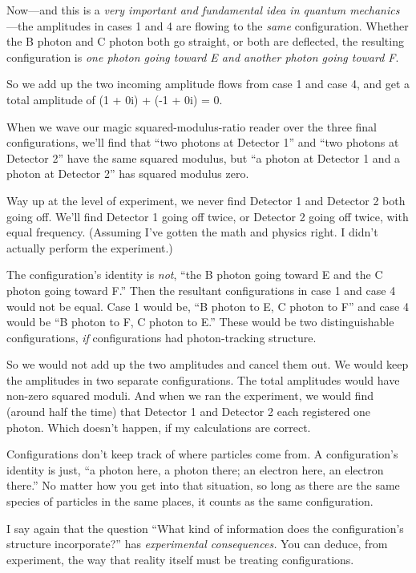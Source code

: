 {
 Now---and this is a \textit{very important and fundamental idea in
quantum mechanics}{}---the amplitudes in cases 1 and 4 are flowing to
the \textit{same} configuration. Whether the B photon and C photon both
go straight, or both are deflected, the resulting configuration is
\textit{one photon going toward E and another photon going toward F}.}

{
 So we add up the two incoming amplitude flows from case 1 and case
4, and get a total amplitude of (1 + 0i) + (-1 + 0i) = 0.}

{
 When we wave our magic squared-modulus-ratio reader over the three
final configurations, we'll find that
``two photons at Detector 1'' and
``two photons at Detector 2'' have
the same squared modulus, but ``a photon at Detector 1
and a photon at Detector 2'' has squared modulus
zero.}

{
 Way up at the level of experiment, we never find Detector 1 and
Detector 2 both going off. We'll find Detector 1 going
off twice, or Detector 2 going off twice, with equal frequency.
(Assuming I've gotten the math and physics right. I
didn't actually perform the experiment.)}

{
 The configuration's identity is \textit{not},
``the B photon going toward E and the C photon going
toward F.'' Then the resultant configurations in case
1 and case 4 would not be equal. Case 1 would be, ``B
photon to E, C photon to F'' and case 4 would be
``B photon to F, C photon to E.''
These would be two distinguishable configurations, \textit{if}
configurations had photon-tracking structure.}

{
 So we would not add up the two amplitudes and cancel them out. We
would keep the amplitudes in two separate configurations. The total
amplitudes would have non-zero squared moduli. And when we ran the
experiment, we would find (around half the time) that Detector 1 and
Detector 2 each registered one photon. Which doesn't
happen, if my calculations are correct.}

{
 Configurations don't keep track of where particles
come from. A configuration's identity is just,
``a photon here, a photon there; an electron here, an
electron there.'' No matter how you get into that
situation, so long as there are the same species of particles in the
same places, it counts as the same configuration.}

{
 I say again that the question ``What kind of
information does the configuration's structure
incorporate?'' has \textit{experimental
consequences.} You can deduce, from experiment, the way that reality
itself must be treating configurations.}

